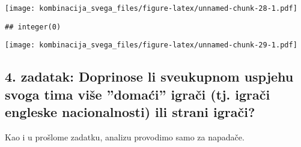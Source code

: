 \documentclass[
]{article}
\newenvironment{Shaded}{\begin{snugshade}}{\end{snugshade}}
\newcommand{\AttributeTok}[1]{\textcolor[rgb]{0.77,0.63,0.00}{#1}}
\newcommand{\CommentTok}[1]{\textcolor[rgb]{0.56,0.35,0.01}{\textit{#1}}}
\newcommand{\DecValTok}[1]{\textcolor[rgb]{0.00,0.00,0.81}{#1}}
\newcommand{\FunctionTok}[1]{\textcolor[rgb]{0.00,0.00,0.00}{#1}}
\newcommand{\NormalTok}[1]{#1}
\newcommand{\OtherTok}[1]{\textcolor[rgb]{0.56,0.35,0.01}{#1}}
\newcommand{\SpecialCharTok}[1]{\textcolor[rgb]{0.00,0.00,0.00}{#1}}
\newcommand{\StringTok}[1]{\textcolor[rgb]{0.31,0.60,0.02}{#1}}
\begin{document}
\texttt{[image: kombinacija\_svega\_files/figure-latex/unnamed-chunk-28-1.pdf]}

\begin{verbatim}
## integer(0)
\end{verbatim}

\begin{Shaded}
\end{Shaded}

\texttt{[image: kombinacija\_svega\_files/figure-latex/unnamed-chunk-29-1.pdf]}

\hypertarget{zadatak-doprinose-li-sveukupnom-uspjehu-svoga-tima-viux161e-domaux107i-igraux10di-tj.-igraux10di-engleske-nacionalnosti-ili-strani-igraux10di}{%
\subsection{4. zadatak: Doprinose li sveukupnom uspjehu svoga tima više
''domaći'' igrači (tj. igrači engleske nacionalnosti) ili strani
igrači?}\label{zadatak-doprinose-li-sveukupnom-uspjehu-svoga-tima-viux161e-domaux107i-igraux10di-tj.-igraux10di-engleske-nacionalnosti-ili-strani-igraux10di}}

Kao i u prošlome zadatku, analizu provodimo samo za napadače.

\begin{Shaded}
\end{Shaded}
\end{document}
